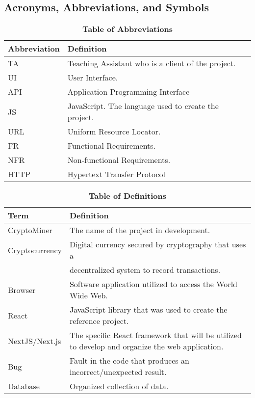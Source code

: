\documentclass[12pt, titlepage]{article}
\begin{document}
\subsection{Acronyms, Abbreviations, and Symbols}

\begin{table}[hbp]
\caption{\textbf{Table of Abbreviations}} \label{Table}

\begin{tabularx}{\textwidth}{p{3cm}X}
\toprule
\textbf{Abbreviation} & \textbf{Definition} \\
\midrule
        TA & Teaching Assistant who is a client of the project. \\ 
        UI & User Interface. \\
        API & Application Programming Interface \\
        JS & JavaScript. The language used to create the project. \\
        URL & Uniform Resource Locator. \\
        FR & Functional Requirements. \\
        NFR & Non-functional Requirements. \\
        HTTP & Hypertext Transfer Protocol\\
\bottomrule
\end{tabularx}

\end{table}

\begin{table}[!htbp]
\caption{\textbf{Table of Definitions}} \label{Table}

\begin{tabularx}{\textwidth}{p{3cm}X}
\toprule
\textbf{Term} & \textbf{Definition}\\
\midrule
        CryptoMiner & The name of the project in development. \\ 
        Cryptocurrency & Digital currency secured by cryptography that uses a \\ & decentralized system to record transactions. \\ 
        Browser & Software application utilized to access the World Wide Web. \\ 
        React & JavaScript library that was used to create the reference project. \\
        NextJS/Next.js & The specific React framework that will be utilized to develop and organize the web application. \\ 
        Bug & Fault in the code that produces an incorrect/unexpected result. \\
        Database & Organized collection of data. \\
\bottomrule
\end{tabularx}

\end{table}	
\end{document}
